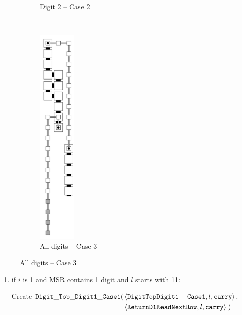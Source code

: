 \begin{itemize}
\begin{figure}[H]
\begin{subfigure}[t]{0.2\textwidth}
                    \caption{\label{fig:warping/digit_top_case2_digit2_msr} Digit 2 -- Case 2}
                \end{subfigure}%
                ~
                \begin{subfigure}[t]{0.2\textwidth}
                    \centering
                    \includegraphics[width=0.2\textwidth]{warping/digit_top_case3_digit3_msr}
                    \caption{\label{fig:warping/digit_top_case3_digit3_msr} All digits -- Case 3}
                \end{subfigure}%
            \end{figure}


            \begin{enumerate}[label=\alph*)]
                \item if $i$ is 1 and MSR contains 1 digit and $l$ starts with 11:

                Create
                $\begin{aligned}[t]
                    {\tt Digit\_Top\_Digit1\_Case1}(& \left \langle {\tt DigitTopDigit1-Case1}, l, {\tt carry} \right\rangle, & \\
                                     & \left \langle {\tt ReturnD1ReadNextRow},  l, {\tt carry} \right\rangle \;)
                \end{aligned}$
                \vspace{.5cm}



\end{enumerate}
\end{itemize}
